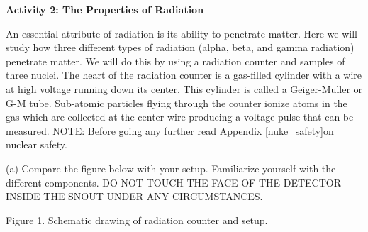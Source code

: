 
\textbf{Activity 2: The Properties of Radiation}

An essential attribute of radiation is its ability to penetrate
matter.
Here we will study how three different types of radiation (alpha, beta,
and gamma radiation) penetrate matter. We will do this by using a radiation counter
 and samples of three nuclei.
The heart of the radiation counter is a gas-filled cylinder with a wire at
high voltage running down its center.
This cylinder is called a Geiger-Muller or G-M tube.
Sub-atomic particles flying through the counter ionize atoms in the gas which are 
collected at the center wire producing a voltage pulse that can be measured.
NOTE: Before going any further read Appendix \ref{nuke_safety}on nuclear safety.

(a) Compare the figure below with your setup. Familiarize yourself with the
different components. DO NOT TOUCH THE FACE OF THE DETECTOR INSIDE
THE SNOUT UNDER ANY CIRCUMSTANCES.

\vspace{0.3cm}
{\centering {} \par}
{\centering Figure 1. Schematic drawing of radiation counter and setup. \par}
\vspace{0.3cm}

